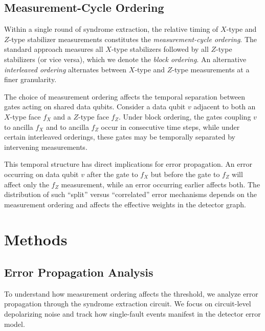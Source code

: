\documentclass[
    reprint,
    aps,
    prx,
    superscriptaddress,
    longbibliography
]{revtex4-2}
\begin{document}
\subsection{Measurement-Cycle Ordering}
\label{subsec:measurement_ordering}

Within a single round of syndrome extraction, the relative timing of $X$-type and $Z$-type stabilizer measurements constitutes the \emph{measurement-cycle ordering}. The standard approach measures all $X$-type stabilizers followed by all $Z$-type stabilizers (or vice versa), which we denote the \emph{block ordering}. An alternative \emph{interleaved ordering} alternates between $X$-type and $Z$-type measurements at a finer granularity.

The choice of measurement ordering affects the temporal separation between gates acting on shared data qubits. Consider a data qubit $v$ adjacent to both an $X$-type face $f_X$ and a $Z$-type face $f_Z$. Under block ordering, the gates coupling $v$ to ancilla $f_X$ and to ancilla $f_Z$ occur in consecutive time steps, while under certain interleaved orderings, these gates may be temporally separated by intervening measurements.

This temporal structure has direct implications for error propagation. An error occurring on data qubit $v$ after the gate to $f_X$ but before the gate to $f_Z$ will affect only the $f_Z$ measurement, while an error occurring earlier affects both. The distribution of such ``split'' versus ``correlated'' error mechanisms depends on the measurement ordering and affects the effective weights in the detector graph.

\section{Methods}
\label{sec:methods}

\subsection{Error Propagation Analysis}
\label{subsec:error_propagation}

To understand how measurement ordering affects the threshold, we analyze error propagation through the syndrome extraction circuit. We focus on circuit-level depolarizing noise and track how single-fault events manifest in the detector error model.
\end{document}
